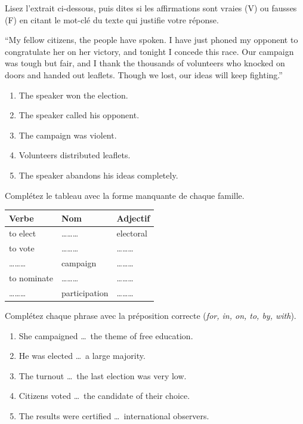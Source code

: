 \documentclass[11pt]{article}
\begin{document}
\begin{exercice}
Lisez l'extrait ci-dessous, puis dites si les affirmations sont vraies (V) ou fausses (F) en citant le mot-clé du texte qui justifie votre réponse.
\begin{textebox}
“My fellow citizens, the people have spoken. I have just phoned my opponent to congratulate her on her victory, and tonight I concede this race. Our campaign was tough but fair, and I thank the thousands of volunteers who knocked on doors and handed out leaflets. Though we lost, our ideas will keep fighting.”
\end{textebox}
\begin{enumerate}
\item The speaker won the election.
\item The speaker called his opponent.
\item The campaign was violent.
\item Volunteers distributed leaflets.
\item The speaker abandons his ideas completely.
\end{enumerate}
\end{exercice}

\begin{exercice}
Complétez le tableau avec la forme manquante de chaque famille.
\begin{center}
\begin{tabular}{|l|l|l|}
\hline
\rowcolor{popblueL} Verbe & Nom & Adjectif \\
\hline
to elect & \ldots\ldots\ldots & electoral \\
\hline
to vote & \ldots\ldots\ldots & \ldots\ldots\ldots \\
\hline
\ldots\ldots\ldots & campaign & \ldots\ldots\ldots \\
\hline
to nominate & \ldots\ldots\ldots & \ldots\ldots\ldots \\
\hline
\ldots\ldots\ldots & participation & \ldots\ldots\ldots \\
\hline
\end{tabular}
\end{center}
\end{exercice}

\begin{exercice}
Complétez chaque phrase avec la préposition correcte (\emph{for, in, on, to, by, with}).
\begin{enumerate}
\item She campaigned \ldots\ the theme of free education.
\item He was elected \ldots\ a large majority.
\item The turnout \ldots\ the last election was very low.
\item Citizens voted \ldots\ the candidate of their choice.
\item The results were certified \ldots\ international observers.
\end{enumerate}
\end{exercice}
\end{document}
